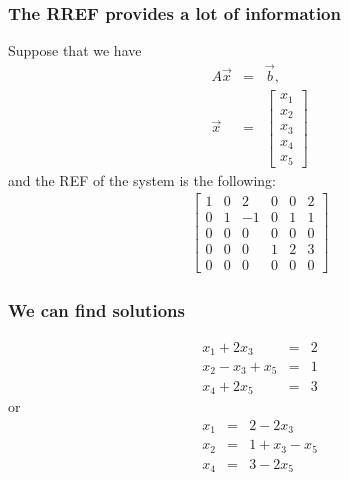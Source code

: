 \begin{frame}
  \frametitle{The RREF provides a lot of information}

  Suppose that we have
  \begin{eqnarray*}
    A\vec{x} & = & \vec{b}, \\
    \vec{x} & = &
    \left[ \begin{array}{r}x_1\\x_2\\x_3\\x_4\\x_5\end{array}\right]
  \end{eqnarray*}
  and the REF of the system is the following:
  \begin{eqnarray*}
    \left[
      \begin{array}{rrrrr|r}
        1 & 0 & 2 & 0 & 0 & 2 \\
        0 & 1 & -1 & 0 & 1 & 1 \\
        0 & 0 & 0 & 0 & 0 & 0 \\
        0 & 0 & 0 & 1 & 2 & 3 \\
        0 & 0 & 0 & 0 & 0 & 0
      \end{array}
    \right]
  \end{eqnarray*}

\end{frame}


\begin{frame}
  \frametitle{We can find solutions}


  \begin{eqnarray*}
    x_1 + 2x_3 & = & 2 \\
    x_2 - x_3 + x_5 & = & 1 \\
    x_4 + 2x_5 & = & 3
  \end{eqnarray*}
  or
  \begin{eqnarray*}
    x_1  & = & 2 -  2x_3\\
    x_2  & = & 1 +  x_3 - x_5\\
    x_4  & = & 3 - 2x_5
  \end{eqnarray*}

\end{frame}

